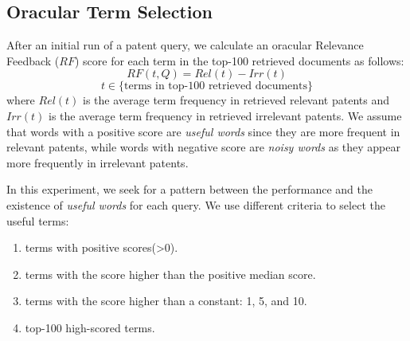 \subsection{Oracular Term Selection}
After an initial run of a patent query, we
calculate an oracular Relevance Feedback ($\mathit{RF}$) score for each term in the top-100
retrieved documents as follows:
\begin{equation}
RF(t,Q)=Rel(t)-Irr(t) 
 \label{eq:score}
\end{equation}
\begin{displaymath}t\in \lbrace \mbox{terms in top-100 retrieved documents}\rbrace\end{displaymath}
where $ \mathit{Rel(t)} $ is the average term frequency in retrieved relevant patents and $ \mathit{Irr(t)} $ is the average term frequency in retrieved irrelevant patents. We assume that words with a positive score are \emph{useful words} since they are more frequent in relevant patents, while words with negative score are \emph{noisy words} as they appear more frequently in irrelevant patents. 

In this experiment, we seek for a pattern between the performance and the existence of \textit{useful words} for each query. We use different criteria to select the useful terms:
\begin{enumerate}
\item terms with positive scores(>0).
\item terms with the score higher than the positive median score.
\item terms with the score higher than a constant: 1, 5, and 10.
\item top-100 high-scored terms.
\end{enumerate}

